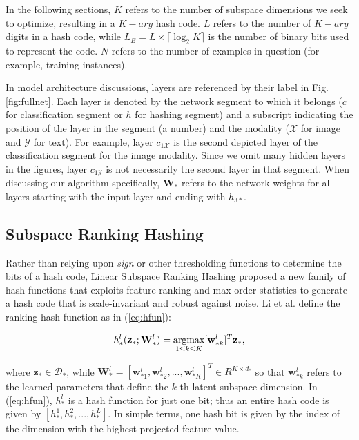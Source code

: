 \documentclass[letterpaper]{article}
\newcommand{\argmax}{\operatornamewithlimits{argmax}}
\begin{document}
In the following sections, $ K $ refers to the number of subspace dimensions we seek to optimize, resulting in a $K-ary$ hash code. $ L $ refers to the number of $K-ary$ digits in a hash code, while $ L_B = L \times \lceil\log_{2}K\rceil $ is  the number of binary bits used to represent the code. $ N $ refers to the number of examples in question (for example, training instances).

In model architecture discussions, layers are referenced by their label in Fig. \ref{fig:fullnet}. Each layer is denoted by the network segment to which it belongs ($ c $ for classification segment or $ h $ for hashing segment) and a subscript indicating the position of the layer in the segment (a number) and the modality ($ \mathcal{X} $ for image and $ \mathcal{Y} $ for text). For example, layer $ c_{1\mathcal{X}} $ is the second depicted layer of the classification segment for the image modality. Since we omit many hidden layers in the figures, layer $ c_{1\mathcal{Y}} $ is not necessarily the second layer in that segment. When discussing our algorithm specifically, $ \mathbf{W_*} $ refers to the network weights for all layers starting with the input layer and ending with $ h_{3*} $.

\subsection{Subspace Ranking Hashing}

Rather than relying upon \emph{sign} or other thresholding functions to determine the bits of a hash code, Linear Subspace Ranking Hashing \cite{kai} proposed a new family of hash functions that exploits feature ranking and max-order statistics to generate a hash code that is scale-invariant and robust against noise. Li et al. define the ranking hash function as in (\ref{eq:hfun}):

\begin{equation}
\label{eq:hfun}
h_*^l(\mathbf{z}_*; \mathbf{W}_*^l) = \argmax\limits_{1 \leq k \leq K} [\mathbf{w}_{*k}^l]^T \mathbf{z}_*,
\end{equation}

\noindent where $ \mathbf{z_*} \in \mathcal{D}_* $, while $ \mathbf{W}_*^l = [\mathbf{w}_{*1}^l, \mathbf{w}_{*2}^l, ..., \mathbf{w}_{*K}^l]^T \in R^{K \times d_*} $ so that $ \mathbf{w}_{*k}^l $ refers to the learned parameters that define the $k$-th latent subspace dimension. In (\ref{eq:hfun}), $ h_*^l $ is a hash function for just one bit; thus an entire hash code is given by $ [h_*^1, h_*^2, ..., h_*^L] $. In simple terms, one hash bit is given by the index of the dimension with the highest projected feature value.
\end{document}

